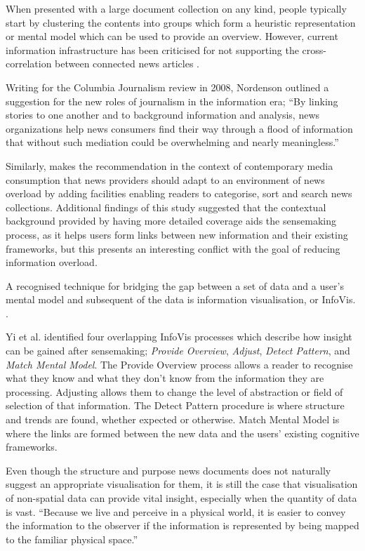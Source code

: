 When presented with a large document collection on any kind, people typically start by clustering the contents into groups which form a heuristic representation or mental model which can be used to provide an overview. \citep{BeingLiteratreWithLargeDocumentCollections} However, current information infrastructure has been criticised for not supporting the cross-correlation between connected news articles \citep{GalaxyOfNews}.

Writing for the Columbia Journalism review in 2008, Nordenson outlined a suggestion for the new roles of journalism in the information era; ``By linking stories to one another and to background information and analysis, news organizations help news consumers find their way through a flood of information that without such mediation could be overwhelming and nearly meaningless.''\citep[p.10]{overloadjournalismsbattle} 

Similarly, \citep{FromInformationToKnowing} makes the recommendation in the context of contemporary media consumption that news providers should adapt to an environment of news overload by adding facilities enabling readers to categorise, sort and search news collections. Additional findings of this study suggested that the contextual background provided by having more detailed coverage aids the sensemaking process, as it helps users form links between new information and their existing frameworks, but this presents an interesting conflict with the goal of reducing information overload. 

A recognised technique for bridging the gap between a set of data and a user's mental model and subsequent of the data is information visualisation, or InfoVis. \citep{UnderstandingAndCharacterizingInsights, ThemeRiver}.

Yi et al. \citep{UnderstandingAndCharacterizingInsights} identified four overlapping InfoVis processes which describe how insight can be gained after sensemaking; \textit{Provide Overview}, \textit{Adjust}, \textit{Detect Pattern}, and \textit{Match Mental Model}. The Provide Overview process allows a reader to recognise what they know and what they don't know from the information they are processing. Adjusting allows them to change the level of abstraction or field of selection of that information. The Detect Pattern procedure is where structure and trends are found, whether expected or otherwise. Match Mental Model is where the links are formed between the new data and the users' existing cognitive frameworks.

Even though the structure and purpose news documents does not naturally suggest an appropriate visualisation for them, it is still the case that visualisation of non-spatial data can provide vital insight, especially when the quantity of data is vast. ``Because we live and perceive in a physical world, it is easier to convey the information to the observer if the information is represented by being mapped to the familiar physical space.''\citep[p.39]{VisualizationsNewTack}

